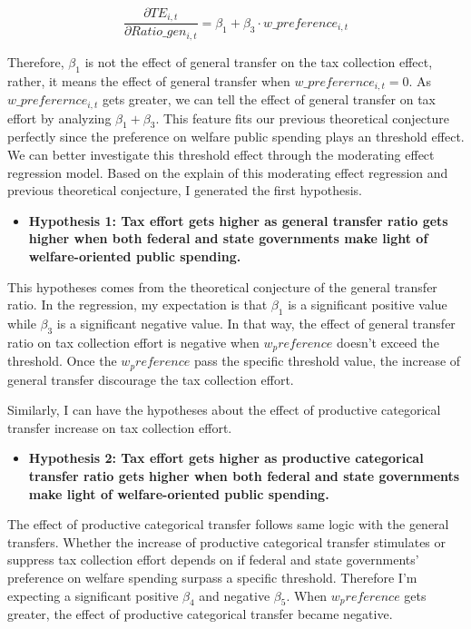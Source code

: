 $$\frac{\partial TE_{i,t}}{\partial Ratio\_gen_{i,t}}=\beta_1+\beta_3 \cdot w\_preference_{i,t} $$

Therefore, $\beta_1$ is not the effect of general transfer on the tax collection effect, rather, it means the effect of general transfer when $w\_preferernce_{i,t}=0$. As $w\_preferernce_{i,t}$ gets greater, we can tell the effect of general transfer on tax effort by analyzing $\beta_1+\beta_3$. This feature fits our previous theoretical conjecture perfectly since the preference on welfare public spending plays an threshold effect. We can better investigate this threshold effect through the moderating effect regression model. Based on the explain of this moderating effect regression and previous theoretical conjecture, I generated the first hypothesis.
\begin{itemize}
    \item \textbf{Hypothesis 1: Tax effort gets higher as general transfer ratio gets higher when both federal and state governments make light of welfare-oriented public spending. }
\end{itemize}

This hypotheses comes from the theoretical conjecture of the general transfer ratio. In the regression, my expectation is that $\beta_1$ is a significant positive value while $\beta_3$ is a significant negative value. In that way, the effect of general transfer ratio on tax collection effort is negative when $w_preference$ doesn't exceed the threshold. Once the $w_preference$ pass the specific threshold value, the increase of general transfer discourage the tax collection effort.

Similarly, I can have the hypotheses about the effect of productive categorical transfer increase on tax collection effort.

\begin{itemize}
    \item \textbf{Hypothesis 2: Tax effort gets higher as productive categorical transfer ratio gets higher when both federal and state governments make light of welfare-oriented public spending. }
\end{itemize}

The effect of productive categorical transfer follows same logic with the general transfers. Whether the increase of productive categorical transfer stimulates or suppress tax collection effort depends on if federal and state governments' preference on welfare spending surpass a specific threshold. Therefore I'm expecting a significant positive $\beta_4$ and negative $\beta_5$. When $w_preference$ gets greater, the effect of productive categorical transfer became negative.



